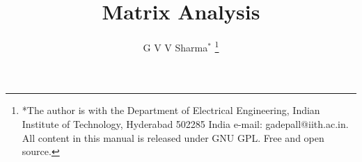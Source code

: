 \documentclass[journal,12pt,twocolumn]{IEEEtran}
\begin{document}
\let\StandardTheFigure\thefigure
\let\vec\mathbf
\renewcommand{\thefigure}{\theproblem}



\def\putbox#1#2#3{\makebox[0in][l]{\makebox[#1][l]{}\raisebox{\baselineskip}[0in][0in]{\raisebox{#2}[0in][0in]{#3}}}}
     \def\rightbox#1{\makebox[0in][r]{#1}}
     \def\centbox#1{\makebox[0in]{#1}}
     \def\topbox#1{\raisebox{-\baselineskip}[0in][0in]{#1}}
     \def\midbox#1{\raisebox{-0.5\baselineskip}[0in][0in]{#1}}

\vspace{3cm}

\title{
	Matrix Analysis
}
\author{ G V V Sharma$^{*}$%
	\thanks{*The author is with the Department
		of Electrical Engineering, Indian Institute of Technology, Hyderabad
		502285 India e-mail:  gadepall@iith.ac.in. All content in this manual is released under GNU GPL.  Free and open source.}
	
}	


%
%
%

% 
%
\end{document}
